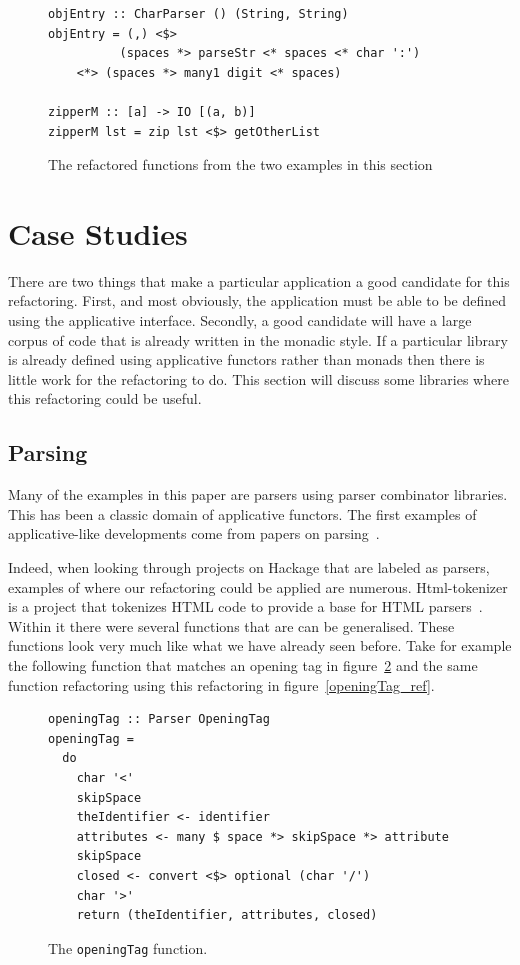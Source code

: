\begin{figure}[t]
\begin{lstlisting}
objEntry :: CharParser () (String, String)
objEntry = (,) <$> 
		  (spaces *> parseStr <* spaces <* char ':') 
	<*> (spaces *> many1 digit <* spaces)

zipperM :: [a] -> IO [(a, b)]
zipperM lst = zip lst <$> getOtherList
\end{lstlisting}
\caption{The refactored functions from the two examples in this section}
\label{final-fns}
\end{figure}

\section{Case Studies}
\label{sec:appApps}

There are two things that make a particular application a good candidate for this refactoring. First, and most obviously, the application must be able to be defined using the applicative interface. Secondly, a good candidate will have a large corpus of code that is already written in the monadic style. If a particular library is already defined using applicative functors rather than monads then there is little work for the refactoring to do.
This section will discuss some libraries where this refactoring could be useful.

\subsection{Parsing}
Many of the examples in this paper are parsers using parser combinator libraries. This has been a classic domain of applicative functors. The first examples of applicative-like developments come from papers on parsing~\citep{efficientParsing,errParsers}.

Indeed, when looking through projects on Hackage that are labeled as parsers, examples of where our refactoring could be applied are numerous. Html-tokenizer is a project that tokenizes HTML code to provide a base for HTML parsers~\citep{htmlTok}. Within it there were several functions that are can be generalised. These functions look very much like what we have already seen before. Take for example the following function that matches an opening tag in figure~\ref{openingTag} and the same function refactoring using this refactoring in figure~\ref{openingTag_ref}.

\begin{figure}[t]
\begin{lstlisting}
openingTag :: Parser OpeningTag
openingTag =
  do
    char '<'
    skipSpace
    theIdentifier <- identifier
    attributes <- many $ space *> skipSpace *> attribute
    skipSpace
    closed <- convert <$> optional (char '/')
    char '>'
    return (theIdentifier, attributes, closed)
\end{lstlisting}
\caption{The \texttt{openingTag} function.}
\label{openingTag}
\end{figure}


